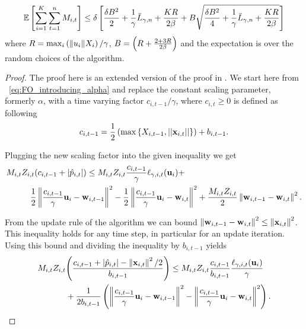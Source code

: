 {\begin{theorem}
\begin{displaymath}
\mathbb{E}\left[{ \sum_{i=1}^{K}\sum_{t=1}^{n}{M_{i,t}}}\right]
\le \delta\left[{\frac{\delta B^2}{2}+\frac{1}{\gamma}{\bar L}_{\gamma,n}+\frac{KR}{2\beta}
+ B\sqrt{\frac{\delta B^2}{4}+\frac{1}{\gamma}{\bar L}_{\gamma,n}+\frac{KR}{2\beta}}}\right]
\end{displaymath}
 where $R = \max_i{\left({\Vert u_i\Vert X_i}\right)/{\gamma}}$, $B=\left({R+\frac{2+3R}{2\beta}}\right)$ and the expectation is over the
random choices of the algorithm.
\end{theorem} \label{thm:adaptive_bound}

 \noindent
 \begin{proof}
The proof here is an extended version of the proof in  . 
We start here from ~\eqref{eq:FO_introducing_alpha} and replace the constant scaling parameter, 
formerly $\alpha$, with a time varying factor $c_{i,t-1}/\gamma$, where $c_{i,t}\ge0$  is defined as following 
\begin{equation*}
c_{i,t-1}=\frac{1}{2}\left({\max{\left\{{X_{i,t-1},\left\vert{\left\vert{\mathbf{x}_{i,t}}\right\vert}\right\vert}\right\}}}\right)+b_{i,t-1}.
\end{equation*}

\noindent
Plugging the new scaling factor into the 
given inequality we get 
\begin{equation*}
\begin{split}
M_{i,t}Z_{i,t}{\left({c_{i,t-1} +\left\vert{\hat{p}_{i,t}}\right\vert}\right)} \le M_{i,t}&Z_{i,t}\frac{c_{i,t-1}}{\gamma} \ell_{\gamma,i,t}(\mathbf{u}_i)+\\ 
\frac{1}{2}\left\Vert {\frac{c_{i,t-1}}{\gamma} \mathbf{u}_i-\mathbf{w}_{i,t-1}} \right\Vert^2&-\frac{1}{2}\left\Vert {\frac{c_{i,t-1}}{\gamma} \mathbf{u}_i-\mathbf{w}_{i,t}} \right\Vert^2+
\frac{M_{i,t}Z_{i,t}}{2}\left\Vert {\mathbf{w}_{i,t-1}-\mathbf{w}_{i,t}} \right\Vert^2.
\end{split}
\end{equation*}

\noindent
From the update rule of the  algorithm we can bound $\left\Vert {\mathbf{w}_{i,t-1}-\mathbf{w}_{i,t}} \right\Vert^2\le \left\Vert {\mathbf{x}_{i,t}} \right\Vert^2$. 
This inequality holds for any time step, in particular for an update iteration. 
Using this bound and dividing the inequality by  $b_{i,t-1}$ yields
\begin{equation}
\begin{split}
M_{i,t}Z_{i,t}&{\left({\frac{c_{i,t-1} +\left\vert{\hat{p}_{i,t}}\right\vert-\left\Vert {\mathbf{x}_{i,t}} \right\Vert^2/2}{b_{i,t-1}}}\right)} \le M_{i,t}Z_{i,t}\frac{c_{i,t-1}}{b_{i,t-1}}\frac{\ell_{\gamma,i,t}(\mathbf{u}_i)}{\gamma} \\ 
&+\frac{1}{2b_{i,t-1
}}\left({\left\Vert {\frac{c_{i,t-1}}{\gamma} \mathbf{u}_i-\mathbf{w}_{i,t-1}} \right\Vert^2-\left\Vert {\frac{c_{i,t-1}}{\gamma} \mathbf{u}_i-\mathbf{w}_{i,t}} \right\Vert^2}\right).
\label{eq:AD_first_step}
\end{split}
\end{equation}


\end{proof}}
